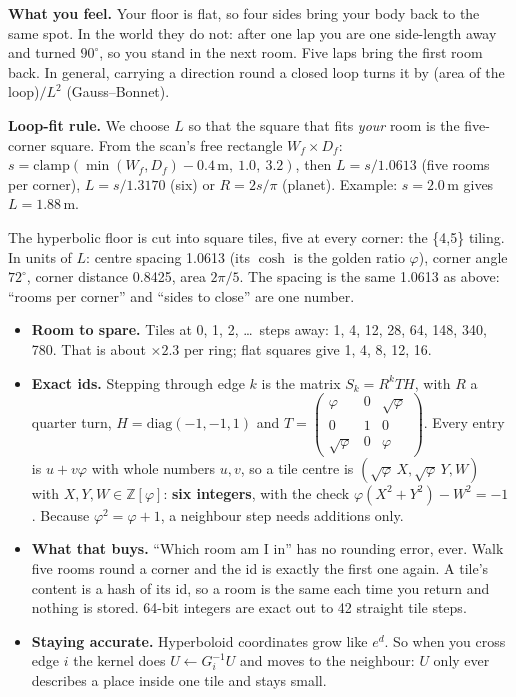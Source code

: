 \documentclass[10pt]{article}
\newcommand{\Sub}[1]{\Needspace{18mm}\vspace{2.5mm}\noindent{\bfseries\color{accD}#1}\par\vspace{0.3mm}}
\begin{document}
\textbf{What you feel.} Your floor is flat, so four sides bring your body back to the same spot. In the world they do not: after one lap you are one side-length away and turned $90^\circ$, so you stand in the next room. Five laps bring the first room back. In general, carrying a direction round a closed loop turns it by (area of the loop)$/L^2$ (Gauss--Bonnet).

\textbf{Loop-fit rule.} We choose $L$ so that the square that fits \emph{your} room is the five-corner square. From the scan's free rectangle $W_f\times D_f$: $s=\mathrm{clamp}(\min(W_f,D_f)-0.4\,\text{m},\ 1.0,\ 3.2)$, then $L=s/1.0613$ (five rooms per corner), $L=s/1.3170$ (six) or $R=2s/\pi$ (planet). Example: $s=2.0$\,m gives $L=1.88$\,m.

\Sub{The world: tiles with exact addresses}

The hyperbolic floor is cut into square tiles, five at every corner: the \{4,5\} tiling. In units of $L$: centre spacing 1.0613 (its $\cosh$ is the golden ratio $\varphi$), corner angle $72^\circ$, corner distance 0.8425, area $2\pi/5$. The spacing is the same 1.0613 as above: ``rooms per corner'' and ``sides to close'' are one number.

\begin{itemize}
\item \textbf{Room to spare.} Tiles at 0, 1, 2, \dots\ steps away: 1, 4, 12, 28, 64, 148, 340, 780. That is about $\times2.3$ per ring; flat squares give 1, 4, 8, 12, 16.
\item \textbf{Exact ids.} Stepping through edge $k$ is the matrix $S_k=R^kTH$, with $R$ a quarter turn, $H=\mathrm{diag}(-1,-1,1)$ and
$T=\left(\begin{smallmatrix}\varphi&0&\sqrt\varphi\\0&1&0\\\sqrt\varphi&0&\varphi\end{smallmatrix}\right)$.
Every entry is $u+v\varphi$ with whole numbers $u,v$, so a tile centre is $(\sqrt\varphi\,X,\sqrt\varphi\,Y,W)$ with $X,Y,W\in\mathbb{Z}[\varphi]$: \textbf{six integers}, with the check $\varphi(X^2+Y^2)-W^2=-1$. Because $\varphi^2=\varphi+1$, a neighbour step needs additions only.
\item \textbf{What that buys.} ``Which room am I in'' has no rounding error, ever. Walk five rooms round a corner and the id is exactly the first one again. A tile's content is a hash of its id, so a room is the same each time you return and nothing is stored. 64-bit integers are exact out to 42 straight tile steps.
\item \textbf{Staying accurate.} Hyperboloid coordinates grow like $e^{d}$. So when you cross edge $i$ the kernel does $U\leftarrow G_i^{-1}U$ and moves to the neighbour: $U$ only ever describes a place inside one tile and stays small.
\end{itemize}
\end{document}

